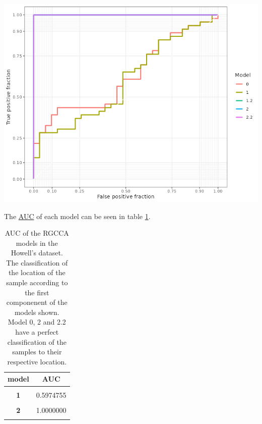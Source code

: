 \documentclass[
  12pt,
  a4paper,
  twoside,
  openright]{book}
\let\origfigure\figure
\let\endorigfigure\endfigure
\renewenvironment{figure}[1][2] {
    \expandafter\origfigure\expandafter[!htbp]
} {
    \endorigfigure
}
\begin{document}
\begin{figure}
\includegraphics[width=1\linewidth]{images/howell-rgcca-auc} \caption[AUC of the RGCCA models in the Howell's dataset.]{AUC of the RGCCA models in the Howell's dataset. The classification of the localization of the sample according to the first component of the gene expression of the models generated with RGCCA on the Howell's dataset.}\label{fig:howell-auc-plot}
\end{figure}

The \protect\hyperlink{acronyms_AUC}{AUC} of each model can be seen in table \ref{tab:howell-auc}.

\begin{table}[H]

\caption[AUC of the RGCCA models in the Howell's dataset]{\label{tab:howell-auc}AUC of the RGCCA models in the Howell's dataset. The classification of the location of the sample according to the first componenent of the models shown. Model 0, 2 and 2.2 have a perfect classification of the samples to their respective location.}
\centering
\begin{tabular}[t]{>{}c|c}
\hline
\textbf{model} & \textbf{AUC}\\
\hline
\textbf{\cellcolor{gray!6}{0}} & \cellcolor{gray!6}{0.6255259}\\
\hline
\textbf{1} & 0.5974755\\
\hline
\textbf{\cellcolor{gray!6}{1.2}} & \cellcolor{gray!6}{1.0000000}\\
\hline
\textbf{2} & 1.0000000\\
\hline
\textbf{\cellcolor{gray!6}{2.2}} & \cellcolor{gray!6}{1.0000000}\\
\hline
\end{tabular}
\end{table}
\end{document}
